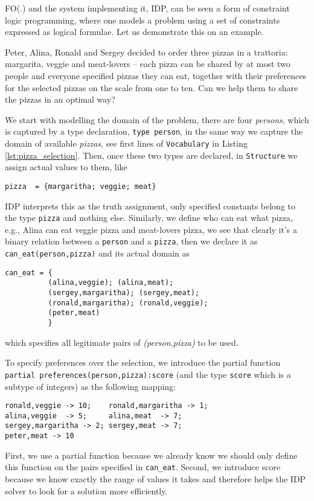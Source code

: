 \pubrev
FO(.) and the system implementing it, IDP, can be seen a form of constraint logic programming, where one models a problem using a set of constraints expressed as logical formulae. 
Let us demonstrate this on an example. 
\begin{example}\label{example:pizza}
	Peter, Alina, Ronald and Sergey decided to order three pizzas in a trattoria: margarita, veggie and meat-lovers -- each pizza can be shared by at most two people and everyone specified pizzas they can eat, together with their preferences for the selected pizzas on the scale from one to ten. Can we help them to share the pizzas in an optimal way?

    We start with modelling the domain of the problem, there are four \textit{persons}, which is captured by a type declaration, \texttt{type person}, in the same way we capture the domain of available \textit{pizzas}, see first lines of \texttt{Vocabulary} in Listing \ref{lst:pizza_selection}. Then, once these two types are declared, in \texttt{Structure} we assign actual values to them, like
\begin{verbatim}
pizza  = {margaritha; veggie; meat}
\end{verbatim}
    IDP interprets this as the truth assignment, only specified constants belong to the type \texttt{pizza} and nothing else. Similarly, we define who can eat what pizza, e.g., Alina can eat veggie pizza and meat-lovers pizza, we see that clearly it's a binary relation between a \texttt{person} and a \texttt{pizza}, then we declare it as \texttt{can\_eat(person,pizza)} and its actual domain as 
\begin{verbatim}
can_eat = {
          (alina,veggie); (alina,meat); 
          (sergey,margaritha); (sergey,meat);
          (ronald,margaritha); (ronald,veggie);
          (peter,meat)
          }
\end{verbatim}
which specifies all legitimate pairs of \textit{(person,pizza)} to be used.

    
To specify preferences over the selection, we introduce the partial function \texttt{partial preferences(person,pizza):score} (and the type \texttt{score} which is a subtype of integers) as the following mapping:
\begin{verbatim}
ronald,veggie -> 10;    ronald,margaritha -> 1; 
alina,veggie  -> 5;     alina,meat  -> 7;
sergey,margaritha -> 2; sergey,meat -> 7;
peter,meat -> 10
\end{verbatim}
\end{example}
First, we use a partial function because we already know we should only define this function on the pairs specified in \texttt{can\_eat}. Second, we introduce score because we know exactly the range of values it takes and therefore helps the IDP solver to look for a solution more efficiently.

